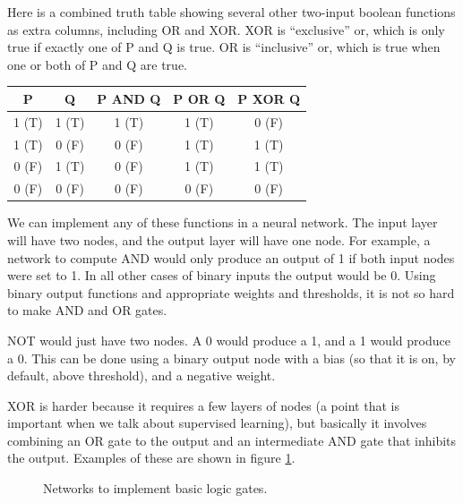 
Here is a combined truth table showing several other two-input boolean functions as extra columns, including OR and XOR. XOR is ``exclusive'' or, which is only true if exactly one of P and Q is true. OR is ``inclusive'' or, which is true when one or both of P and Q are true.

\begin{center}
\begin{tabular}{| c | c || c || c || c | }
\hline
  P  & Q & P AND Q  & P OR Q & P XOR Q \\
\hline
  1 (T) & 1 (T) & 1 (T) & 1 (T) & 0 (F) \\
\hline
  1 (T) & 0 (F) & 0 (F) & 1 (T) & 1 (T) \\
\hline
  0 (F) & 1 (T) & 0 (F) & 1 (T) & 1 (T) \\
\hline
 0 (F) & 0 (F) & 0 (F) & 0 (F) & 0 (F) \\
\hline
\end{tabular}
\end{center}

We can implement any of these functions in a neural network. The input layer will have two nodes, and the output layer will have one node. For example, a network to compute AND would only produce an output of 1 if both input nodes were set to 1. In all other cases of binary inputs the output would be 0. Using binary output functions and appropriate weights and thresholds, it is not so hard to make AND and OR gates.

NOT would just have two nodes. A 0 would produce a 1, and a 1 would produce a 0. This can be done using a binary output node with a bias (so that it is on, by default, above threshold), and a negative weight.

XOR is harder because it requires a few layers of nodes (a point that is important when we talk about supervised learning), but basically it involves combining an OR gate to the output and an intermediate AND gate that inhibits the output. Examples of these are shown in figure \ref{logic_gates}.

\begin{figure}[h]
\centering
{}
\caption[Simbrain screenshot]{Networks to implement basic logic gates.}
\label{logic_gates}
\end{figure}


